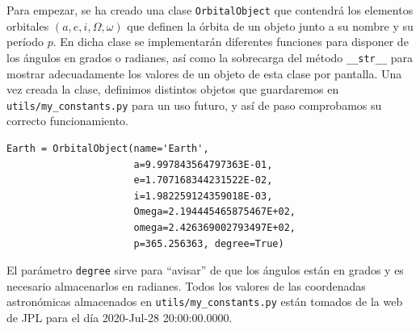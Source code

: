 \documentclass[11pt]{book}
\begin{document}
Para empezar, se ha creado una clase \texttt{OrbitalObject} que contendrá los elementos orbitales $(a,e,i,\Omega,\omega)$ que definen la órbita de un objeto junto a su nombre y su período $p$. En dicha clase se implementarán diferentes funciones para disponer de los ángulos en grados o radianes, así como la sobrecarga del método \texttt{\_\_str\_\_} para mostrar adecuadamente los valores de un objeto de esta clase por pantalla. Una vez creada la clase, definimos distintos objetos que guardaremos en \texttt{utils/my\_constants.py} para un uso futuro, y así de paso comprobamos su correcto funcionamiento.
\begin{lstlisting}[style=PythonCode]
Earth = OrbitalObject(name='Earth',
                      a=9.997843564797363E-01,
                      e=1.707168344231522E-02,
                      i=1.982259124359018E-03,
                      Omega=2.194445465875467E+02,
                      omega=2.426369002793497E+02,
                      p=365.256363, degree=True)
\end{lstlisting}

El parámetro \texttt{degree} sirve para ``avisar'' de que los ángulos están en grados y es necesario almacenarlos en radianes. Todos los valores de las coordenadas astronómicas almacenados en \texttt{utils/my\_constants.py} están tomados de la web de JPL \cite{jpl} para el día 2020-Jul-28 20:00:00.0000.\\
\end{document}
